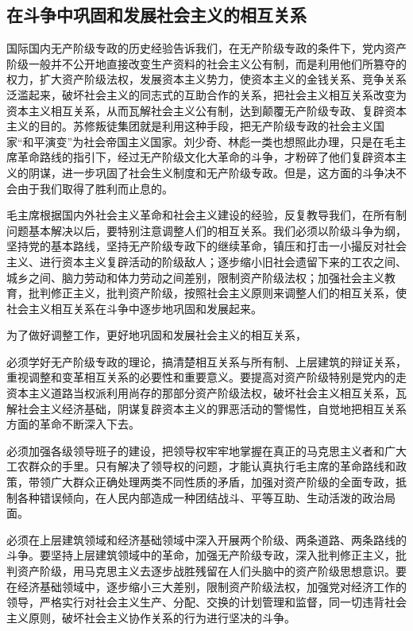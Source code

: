 \documentclass{book}
\begin{document}
\subsection{在斗争中巩固和发展社会主义的相互关系}

国际国内无产阶级专政的历史经验告诉我们，在无产阶级专政的条件下，党内资产阶级一般并不公开地直接改变生产资料的社会主义公有制，而是利用他们所篡夺的权力，扩大资产阶级法权，发展资本主义势力，使资本主义的金钱关系、竞争关系泛滥起来，破坏社会主义的同志式的互助合作的关系，把社会主义相互关系改变为资本主义相互关系，从而瓦解社会主义公有制，达到颠覆无产阶级专政、复辟资本主义的目的。苏修叛徒集团就是利用这种手段，把无产阶级专政的社会主义国家“和平演变”为社会帝国主义国家。刘少奇、林彪一类也想照此办理，只是在毛主席革命路线的指引下，经过无产阶级文化大革命的斗争，才粉碎了他们复辟资本主义的阴谋，进一步巩固了社会生义制度和无产阶级专政。但是，这方面的斗争决不会由于我们取得了胜利而止息的。

毛主席根据国内外社会主义革命和社会主义建设的经验，反复教导我们，在所有制问题基本解决以后，要特别注意调整人们的相互关系。我们必须以阶级斗争为纲，坚持党的基本路线，坚持无产阶级专政下的继续革命，镇压和打击一小撮反对社会主义、进行资本主义复辟活动的阶级敌人；逐步缩小旧社会遗留下来的工农之间、城乡之间、脑力劳动和体力劳动之间差别，限制资产阶级法权；加强社会主义教育，批判修正主义，批判资产阶级，按照社会主义原则来调整人们的相互关系，使社会主义相互关系在斗争中逐步地巩固和发展起来。

为了做好调整工作，更好地巩固和发展社会主义的相互关系，

必须学好无产阶级专政的理论，搞清楚相互关系与所有制、上层建筑的辩证关系，重视调整和变革相互关系的必要性和重要意义。要提高对资产阶级特别是党内的走资本主义道路当权派利用尚存的那部分资产阶级法权，破坏社会主义相互关系，瓦解社会主义经济基础，阴谋复辟资本主义的罪恶活动的警惕性，自觉地把相互关系方面的革命不断深入下去。

必须加强各级领导班子的建设，把领导权牢牢地掌握在真正的马克思主义者和广大工农群众的手里。只有解决了领导权的问题，才能认真执行毛主席的革命路线和政策，带领广大群众正确处理两类不同性质的矛盾，加强对资产阶级的全面专政，抵制各种错误倾向，在人民内部造成一种团结战斗、平等互助、生动活泼的政治局面。

必须在上层建筑领域和经济基础领域中深入开展两个阶级、两条道路、两条路线的斗争。要坚持上层建筑领域中的革命，加强无产阶级专政，深入批判修正主义，批判资产阶级，用马克思主义去逐步战胜残留在人们头脑中的资产阶级思想意识。要在经济基础领域中，逐步缩小三大差别，限制资产阶级法权，加强党对经济工作的领导，严格实行对社会主义生产、分配、交换的计划管理和监督，同一切违背社会主义原则，破坏社会主义协作关系的行为进行坚决的斗争。
\end{document}
